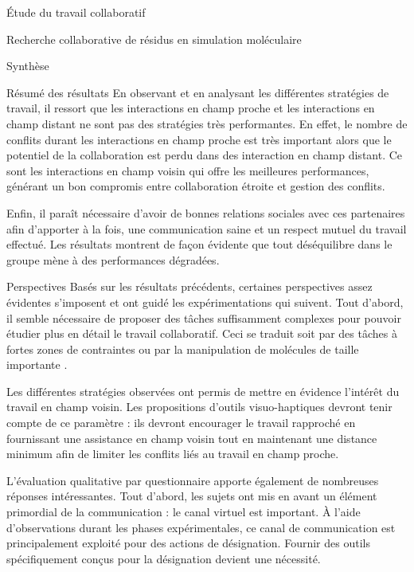\documentclass[myfrancais]{mythesis}
\begin{document}
\begin{mypart}{Étude du travail collaboratif}
\begin{mychapter}{Recherche collaborative de résidus en simulation moléculaire}
\begin{mysection}{Synthèse}
\begin{mysubsection}{Résumé des résultats}
					En observant et en analysant les différentes stratégies de travail, il ressort que les interactions en champ proche et les interactions en champ distant ne sont pas des stratégies très performantes.
					En effet, le nombre de conflits durant les interactions en champ proche est très important alors que le potentiel de la collaboration est perdu dans des interaction en champ distant.
					Ce sont les interactions en champ voisin qui offre les meilleures performances, générant un bon compromis entre collaboration étroite et gestion des conflits.

					Enfin, il paraît nécessaire d'avoir de bonnes relations sociales avec ces partenaires afin d'apporter à la fois, une communication saine et un respect mutuel du travail effectué.
					Les résultats montrent de façon évidente que tout déséquilibre dans le groupe mène à des performances dégradées.
				\end{mysubsection}
				\begin{mysubsection}{Perspectives}
					Basés sur les résultats précédents, certaines perspectives assez évidentes s'imposent et ont guidé les expérimentations qui suivent.
					Tout d'abord, il semble nécessaire de proposer des tâches suffisamment complexes pour pouvoir étudier plus en détail le travail collaboratif.
					Ceci se traduit soit par des tâches à fortes zones de contraintes  ou par la manipulation de molécules de taille importante .

					Les différentes stratégies observées ont permis de mettre en évidence l'intérêt du travail en champ voisin.
					Les propositions d'outils visuo-haptiques devront tenir compte de ce paramètre : ils devront encourager le travail rapproché en fournissant une assistance en champ voisin tout en maintenant une distance minimum afin de limiter les conflits liés au travail en champ proche.

					L'évaluation qualitative par questionnaire apporte également de nombreuses réponses intéressantes.
					Tout d'abord, les sujets ont mis en avant un élément primordial de la communication : le canal virtuel est important.
					À l'aide d'observations durant les phases expérimentales, ce canal de communication est principalement exploité pour des actions de désignation.
					Fournir des outils spécifiquement conçus pour la désignation devient une nécessité.


\end{mysubsection}
\end{mysection}
\end{mychapter}
\end{mypart}
\end{document}

